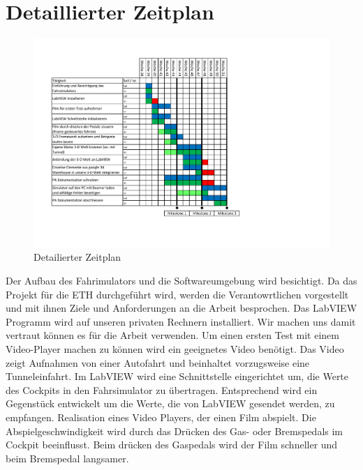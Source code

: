 \section{Detaillierter Zeitplan}
\label{detaillierter_zeitplan}

\begin{figure}[H]
\centering 
\includegraphics[width=1.0\linewidth]{src/Zeitplan.pdf}
\caption{Detailierter Zeitplan} %
\label{zeitplan} %
\end{figure}
Der Aufbau des Fahrimulators und die Softwareumgebung wird besichtigt. Da das Projekt für die ETH durchgeführt wird, werden die Verantowrtlichen vorgestellt und mit ihnen Ziele und Anforderungen an die Arbeit besprochen. 
Das LabVIEW Programm wird auf unseren privaten Rechnern installiert. Wir machen uns damit vertraut können es für die Arbeit verwenden. 
Um einen ersten Test mit einem Video-Player machen zu können wird ein geeignetes Video benötigt. Das Video zeigt Aufnahmen von einer Autofahrt und beinhaltet vorzugsweise eine Tunneleinfahrt.
Im LabVIEW wird eine Schnittstelle eingerichtet um, die Werte des Cockpits in den Fahrsimulator zu übertragen. Entsprechend wird ein Gegenstück entwickelt um die Werte, die von LabVIEW gesendet werden, zu empfangen. 
Realisation eines Video Players, der einen Film abspielt. Die Abspielgeschwindigkeit wird durch das Drücken des Gas- oder Bremspedals im Cockpit beeinflusst. Beim drücken des Gaspedals wird der Film schneller und beim Bremspedal langsamer. 
